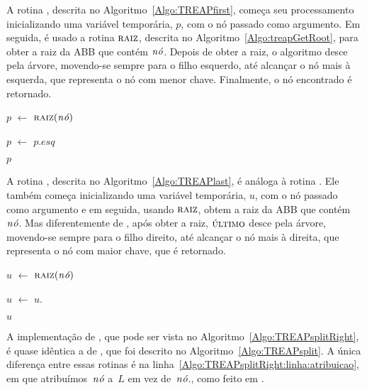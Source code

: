 A rotina \treapFirst{}, descrita no Algoritmo~\ref{Algo:TREAPfirst}, começa seu processamento inicializando uma variável temporária, $p$, com o nó passado como argumento.
Em seguida, é usado a rotina $\treapGetRoot$, descrita no Algoritmo~\ref{Algo:treapGetRoot}, para obter a raiz da ABB que contém $\node$.
Depois de obter a raiz, o algoritmo desce pela árvore, movendo-se sempre para o filho esquerdo, até alcançar o nó mais à esquerda, que representa o nó com menor chave.
Finalmente, o nó encontrado é retornado.

\begin{algorithm}
\caption{\treapFirst($\node$)}
\label{Algo:TREAPfirst}
\begin{algorithmic}[1]
\State $p$ $\gets$ $\treapGetRoot(\node)$

  \State $p$ $\gets$ $p$.$esq$
\EndWhile

\State\Return $p$
\end{algorithmic}
\end{algorithm}

A rotina \treapLast{}, descrita no Algoritmo~\ref{Algo:TREAPlast}, é análoga à rotina \treapFirst{}.
Ele também começa inicializando uma variável temporária, $u$, com o nó passado como argumento e em seguida, usando $\treapGetRoot$, obtem a raiz da ABB que contém $\node$.
Mas diferentemente de \treapFirst{}, após obter a raiz, $\treapLast$ desce pela árvore, movendo-se sempre para o filho direito, até alcançar o nó mais à direita, que representa o nó com maior chave, que é retornado.

\begin{algorithm}
\caption{\treapLast($\node$)}
\label{Algo:TREAPlast}
\begin{algorithmic}[1]
\State $u$ $\gets$ $\treapGetRoot(\node)$

  \State $u$ $\gets$ $u$.
\EndWhile

\State\Return $u$
\end{algorithmic}
\end{algorithm}

A implementação de \treapSplitRight{}, que pode ser vista no Algoritmo~\ref{Algo:TREAPsplitRight}, é quase idêntica a de \treapSplit{}, que foi descrito no Algoritmo~\ref{Algo:TREAPsplit}.
A única diferença entre essas rotinas é na linha~\ref{Algo:TREAPsplitRight:linha:atribuicao}, em que atribuímos~$\node$ a~$L$ em vez de~$\node$., como feito em \treapSplit{}.

